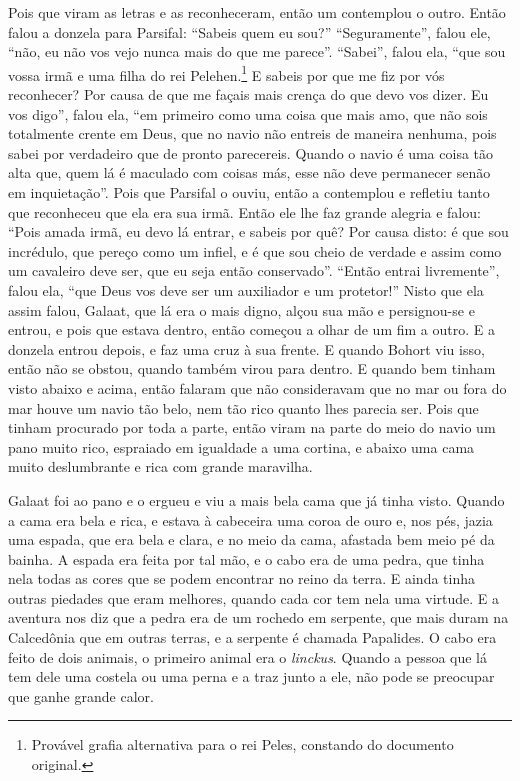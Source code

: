 Pois que viram as letras e as reconheceram, então um contemplou o outro. Então
falou a donzela para Parsifal: “Sabeis quem eu sou?” “Seguramente”, falou
ele, “não, eu não vos vejo nunca mais do que me parece”. “Sabei”, falou ela,
“que sou vossa irmã e uma filha do rei Pelehen.\footnote{ Provável grafia
alternativa para o rei Peles, constando do documento original.} E
sabeis por que me fiz por vós reconhecer? Por causa de que me façais mais
crença do que devo vos dizer. Eu vos digo”, falou ela, “em primeiro como uma
coisa que mais amo, que não sois totalmente crente em Deus, que no navio não
entreis de maneira nenhuma, pois sabei por verdadeiro que de pronto
parecereis. Quando o navio é uma coisa tão alta que, quem lá é maculado com
coisas más, esse não deve permanecer senão em inquietação”.
Pois que Parsifal o ouviu, então a contemplou e refletiu tanto que reconheceu
que ela era sua irmã. Então ele lhe faz grande alegria e falou: “Pois amada
irmã, eu devo lá entrar, e sabeis por quê? Por causa disto: é que sou
incrédulo, que pereço como um infiel, e é que sou cheio de verdade e assim como
um cavaleiro deve ser, que eu seja então conservado”. “Então entrai
livremente”, falou ela, “que Deus vos deve ser um auxiliador e um protetor!”
Nisto que ela assim falou, Galaat, que lá era o mais digno, alçou sua mão e
persignou-se e entrou, e pois que estava dentro, então começou a olhar de um
fim a outro. E a donzela entrou depois, e faz uma cruz à sua frente. E quando
Bohort viu isso, então não se obstou, quando também virou para dentro. E quando
bem tinham visto abaixo e acima, então falaram que não consideravam que no mar
ou fora do mar houve um navio tão belo, nem tão rico quanto lhes parecia ser.
Pois que tinham procurado por toda a parte, então viram na parte do meio do
navio um pano muito rico, espraiado em igualdade a uma cortina, e abaixo uma
cama muito deslumbrante e rica com grande maravilha.

Galaat foi ao pano e o ergueu e viu a mais bela cama que já tinha visto. Quando
a cama era bela e rica, e estava à cabeceira uma coroa de ouro e, nos pés,
jazia uma espada, que era bela e clara, e no meio da cama, afastada bem meio pé
da bainha. A espada era feita por tal mão, e o cabo era de uma pedra, que tinha
nela todas as cores que se podem encontrar no reino da terra. E ainda tinha
outras piedades que eram melhores, quando cada cor tem nela uma virtude. E a
aventura nos diz que a pedra era de um rochedo em serpente, que mais duram na
Calcedônia que em outras terras, e a serpente é chamada Papalides. O
cabo era feito de dois animais, o primeiro animal era o \textit{linckus}.
Quando a pessoa que lá tem dele uma costela ou uma perna e a traz junto a ele,
não pode se preocupar que ganhe grande calor.

